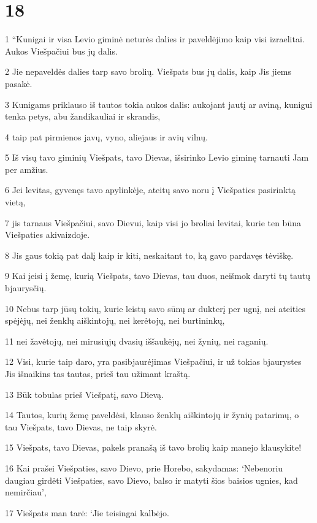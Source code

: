 \chapter{18}


\par 1 “Kunigai ir visa Levio giminė neturės dalies ir paveldėjimo kaip visi izraelitai. Aukos Viešpačiui bus jų dalis. 
\par 2 Jie nepaveldės dalies tarp savo brolių. Viešpats bus jų dalis, kaip Jis jiems pasakė. 
\par 3 Kunigams priklauso iš tautos tokia aukos dalis: aukojant jautį ar aviną, kunigui tenka petys, abu žandikauliai ir skrandis, 
\par 4 taip pat pirmienos javų, vyno, aliejaus ir avių vilnų. 
\par 5 Iš visų tavo giminių Viešpats, tavo Dievas, išsirinko Levio giminę tarnauti Jam per amžius. 
\par 6 Jei levitas, gyvenęs tavo apylinkėje, ateitų savo noru į Viešpaties pasirinktą vietą, 
\par 7 jis tarnaus Viešpačiui, savo Dievui, kaip visi jo broliai levitai, kurie ten būna Viešpaties akivaizdoje. 
\par 8 Jis gaus tokią pat dalį kaip ir kiti, neskaitant to, ką gavo pardavęs tėviškę. 
\par 9 Kai įeisi į žemę, kurią Viešpats, tavo Dievas, tau duos, neišmok daryti tų tautų bjaurysčių. 
\par 10 Nebus tarp jūsų tokių, kurie leistų savo sūnų ar dukterį per ugnį, nei ateities spėjėjų, nei ženklų aiškintojų, nei kerėtojų, nei burtininkų, 
\par 11 nei žavėtojų, nei mirusiųjų dvasių iššaukėjų, nei žynių, nei raganių. 
\par 12 Visi, kurie taip daro, yra pasibjaurėjimas Viešpačiui, ir už tokias bjaurystes Jis išnaikins tas tautas, prieš tau užimant kraštą. 
\par 13 Būk tobulas prieš Viešpatį, savo Dievą. 
\par 14 Tautos, kurių žemę paveldėsi, klauso ženklų aiškintojų ir žynių patarimų, o tau Viešpats, tavo Dievas, ne taip skyrė. 
\par 15 Viešpats, tavo Dievas, pakels pranašą iš tavo brolių kaip mane­jo klausykite! 
\par 16 Kai prašei Viešpaties, savo Dievo, prie Horebo, sakydamas: ‘Nebenoriu daugiau girdėti Viešpaties, savo Dievo, balso ir matyti šios baisios ugnies, kad nemirčiau’, 
\par 17 Viešpats man tarė: ‘Jie teisingai kalbėjo. 
